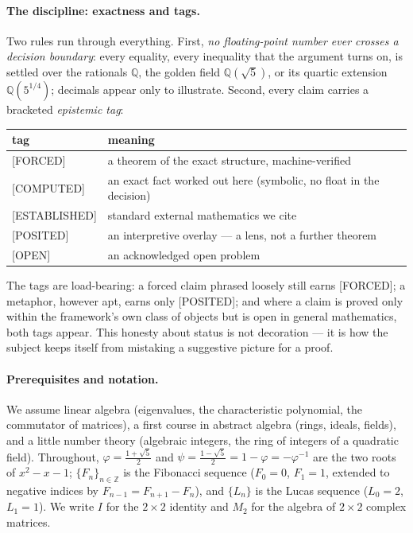 \documentclass[11pt]{article}
\theoremstyle{plain}
\theoremstyle{definition}
\theoremstyle{remark}
\newcommand{\Forced}{\textcolor{forcedc}{[FORCED]}}
\newcommand{\Computed}{\textcolor{forcedc}{[COMPUTED]}}
\newcommand{\Estab}{\textcolor{estabc}{[ESTABLISHED]}}
\newcommand{\Posited}{\textcolor{positedc}{[POSITED]}}
\newcommand{\Openq}{\textcolor{openc}{[OPEN]}}
\begin{document}
\paragraph{The discipline: exactness and tags.} Two rules run through everything. First, \emph{no floating-point number ever crosses a decision boundary}: every equality, every inequality that the argument turns on, is settled over the rationals $ℚ$, the golden field $ℚ(\sqrt5)$, or its quartic extension $ℚ(5^{1/4})$; decimals appear only to illustrate. Second, every claim carries a bracketed \emph{epistemic tag}:
\begin{center}\small
\begin{tabular}{@{}ll@{}}
\toprule
tag & meaning \\
\midrule
\Forced & a theorem of the exact structure, machine-verified \\
\Computed & an exact fact worked out here (symbolic, no float in the decision) \\
\Estab & standard external mathematics we cite \\
\Posited & an interpretive overlay --- a lens, not a further theorem \\
\Openq & an acknowledged open problem \\
\bottomrule
\end{tabular}
\end{center}
The tags are load-bearing: a forced claim phrased loosely still earns \Forced; a metaphor, however apt, earns only \Posited; and where a claim is proved only within the framework's own class of objects but is open in general mathematics, both tags appear. This honesty about status is not decoration --- it is how the subject keeps itself from mistaking a suggestive picture for a proof.

\paragraph{Prerequisites and notation.} We assume linear algebra (eigenvalues, the characteristic polynomial, the commutator of matrices), a first course in abstract algebra (rings, ideals, fields), and a little number theory (algebraic integers, the ring of integers of a quadratic field). Throughout, $φ=\tfrac{1+\sqrt5}{2}$ and $ψ=\tfrac{1-\sqrt5}{2}=1-φ=-φ^{-1}$ are the two roots of $x^{2}-x-1$; $\{F_n\}_{n∈ℤ}$ is the Fibonacci sequence ($F_0=0$, $F_1=1$, extended to negative indices by $F_{n-1}=F_{n+1}-F_n$), and $\{L_n\}$ is the Lucas sequence ($L_0=2$, $L_1=1$). We write $I$ for the $2×2$ identity and $M_2$ for the algebra of $2×2$ complex matrices.
\end{document}
